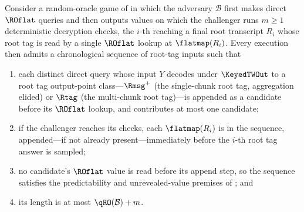 \begin{lemma}
\label{lem:root-candidate-seq}
Consider a random-oracle game of  in which the
adversary $\mathcal{B}$ first makes direct $\ROflat$ queries and then
outputs values on which the challenger runs $m \geq 1$ deterministic
decryption checks, the $i$-th reaching a final root transcript $R_i$
whose root tag is read by a single $\ROflat$ lookup at $\flatmap(R_i)$.
Every execution then admits a chronological sequence of root-tag inputs
such that
\begin{enumerate}
\item each distinct direct query whose input $Y$ decodes under
  $\KeyedTWOut$ to a root tag output-point class---$\Rmsg^+$ (the
  single-chunk root tag, aggregation elided) or $\Rtag$ (the multi-chunk
  root tag)---is appended as a candidate before its $\ROflat$ lookup, and
  contributes at most one candidate;
\item if the challenger reaches its checks, each $\flatmap(R_i)$ is in
  the sequence, appended---if not already present---immediately before
  the $i$-th root tag answer is sampled;
\item no candidate's $\ROflat$ value is read before its append step, so
  the sequence satisfies the predictability and unrevealed-value premises
  of ;
  and
\item its length is at most $\qRO(\mathcal{B}) + m$.
\end{enumerate}
\end{lemma}

